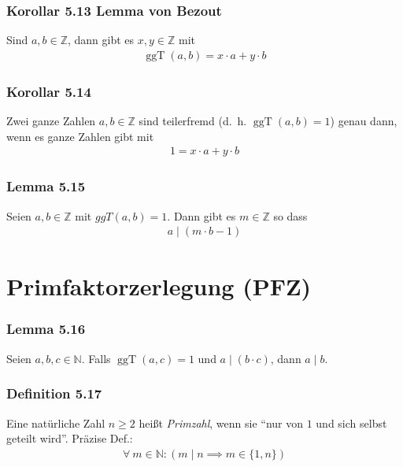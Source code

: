 \documentclass[a5paper, 10pt]{book}
\makeatletter
\DeclareMathOperator{\ggT}{ggT}
\newcommand{\inN}{\in\mathbb{N}}
\newcommand{\inZ}{\in\mathbb{Z}}
\newcommand{\keyword}[1]{\emph{#1}\index{#1@\textbf{#1}}}
\renewcommand{\keyword}[1]{\keywordUnwichitg{#1}}
\newcommand{\keywordUnwichitg}[1]{\emph{#1}\index{#1}}
\makeatother
\begin{document}
			\subsubsection{Korollar 5.13 Lemma von Bezout}
				Sind $a,b\inZ$, dann gibt es $x,y\inZ$ mit
				\begin{align}
					\ggT(a,b) = x\cdot a + y\cdot b
				\end{align}
				
			\subsubsection{Korollar 5.14}
				Zwei ganze Zahlen $a,b\inZ$ sind teilerfremd (d.~h. $\ggT(a,b)=1$) genau dann, wenn es ganze Zahlen gibt mit
				\begin{align}
					1 = x\cdot a + y\cdot b
				\end{align}
				
			\subsubsection{Lemma 5.15}
				Seien $a,b\inZ$ mit $ggT(a,b)=1$. Dann gibt es $m\inZ$ so dass
				\begin{align}
					a \mid (m\cdot b - 1)
				\end{align}
				
		\section{Primfaktorzerlegung (PFZ)}
		
			\subsubsection{Lemma 5.16}
				Seien $a,b,c\inN$. Falls $\ggT(a,c)=1$ und $a\mid (b\cdot c)$, dann $a\mid b$.
				
			\subsubsection{Definition 5.17}
				Eine natürliche Zahl $n \geq 2$ heißt \keyword{Primzahl}, wenn sie ``nur von $1$ und sich selbst geteilt wird''. Präzise Def.:
				\begin{align}
					\forall\ m\inN : \left( m \mid n \implies m \in \{1,n\}\right)
				\end{align}
				
\end{document}

